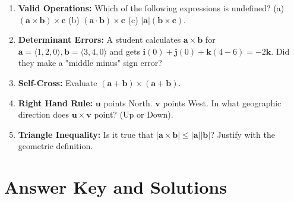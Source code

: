 \documentclass[11pt]{article}
\begin{document}
\begin{enumerate}
\section*{Part 6: Conceptual Diagnostics ("Find the Flaw")}
    
    \item \textbf{Valid Operations:} Which of the following expressions is undefined? 
    (a) $(\mathbf{a} \times \mathbf{b}) \times \mathbf{c}$ 
    (b) $(\mathbf{a} \cdot \mathbf{b}) \times \mathbf{c}$ 
    (c) $|\mathbf{a}|(\mathbf{b} \times \mathbf{c})$.
    
    \item \textbf{Determinant Errors:} A student calculates $\mathbf{a} \times \mathbf{b}$ for $\mathbf{a}=\langle 1, 2, 0 \rangle, \mathbf{b}=\langle 3, 4, 0 \rangle$ and gets $\mathbf{i}(0) + \mathbf{j}(0) + \mathbf{k}(4-6) = -2\mathbf{k}$. Did they make a "middle minus" sign error?
    
    \item \textbf{Self-Cross:} Evaluate $(\mathbf{a} + \mathbf{b}) \times (\mathbf{a} + \mathbf{b})$.
    
    \item \textbf{Right Hand Rule:} $\mathbf{u}$ points North. $\mathbf{v}$ points West. In what geographic direction does $\mathbf{u} \times \mathbf{v}$ point? (Up or Down).
    
    \item \textbf{Triangle Inequality:} Is it true that $|\mathbf{a} \times \mathbf{b}| \le |\mathbf{a}| |\mathbf{b}|$? Justify with the geometric definition.

\end{enumerate}

\newpage

\section*{Answer Key and Solutions}
\end{document}

